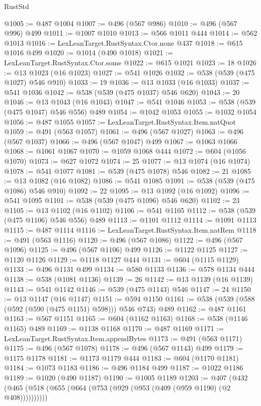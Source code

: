 \begin{lexlean}{RustStd}
\begin{coremodule}
@1005 := @487 @1004
@1007 := @496 (@567 @986)
@1010 := @496 (@567 @996) @499
@1011 := @1007 @1010
@1013 := @566 @1011 @444
@1014 := @562 @1013
@1016 := LexLeanTarget.RustSyntax.Ctor.none @437
@1018 := @615 @1016 @499
@1020 := @1014 (@490 @1018)
@1021 := LexLeanTarget.RustSyntax.Ctor.some
@1022 := @615 @1021
@1023 := 18
@1026 := @13 @1023 (@16 @1023)
@1027 := @541 @1026
@1032 := @538 (@539 (@475 @1027) @546 @910)
@1033 := 19
@1036 := @13 @1033 (@16 @1033)
@1037 := @541 @1036
@1042 := @538 (@539 (@475 @1037) @546 @620)
@1043 := 20
@1046 := @13 @1043 (@16 @1043)
@1047 := @541 @1046
@1053 := @538 (@539 (@475 @1047) @546 @556) @489
@1054 := @1042 @1053
@1055 := @1032 @1054
@1056 := @487 @1055
@1057 := LexLeanTarget.RustSyntax.Item.natQuot
@1059 := @491 (@563 @1057)
@1061 := @496 (@567 @1027)
@1063 := @496 (@567 @1037)
@1066 := @496 (@567 @1047) @499
@1067 := @1063 @1066
@1068 := @1061 @1067
@1070 := @1059 @1068 @444
@1072 := @604 (@1056 @1070)
@1073 := @627 @1072
@1074 := 25
@1077 := @13 @1074 (@16 @1074)
@1078 := @541 @1077
@1081 := @539 (@475 @1078) @546
@1082 := 21
@1085 := @13 @1082 (@16 @1082)
@1086 := @541 @1085
@1091 := @538 (@539 (@475 @1086) @546 @910)
@1092 := 22
@1095 := @13 @1092 (@16 @1092)
@1096 := @541 @1095
@1101 := @538 (@539 (@475 @1096) @546 @620)
@1102 := 23
@1105 := @13 @1102 (@16 @1102)
@1106 := @541 @1105
@1112 := @538 (@539 (@475 @1106) @546 @556) @489
@1113 := @1101 @1112
@1114 := @1091 @1113
@1115 := @487 @1114
@1116 := LexLeanTarget.RustSyntax.Item.natRem
@1118 := @491 (@563 @1116)
@1120 := @496 (@567 @1086)
@1122 := @496 (@567 @1096)
@1125 := @496 (@567 @1106) @499
@1126 := @1122 @1125
@1127 := @1120 @1126
@1129 := @1118 @1127 @444
@1131 := @604 (@1115 @1129)
@1133 := @496 @1131 @499
@1134 := @580 @1133
@1136 := @578 @1134 @444
@1138 := @538 (@1081 @1136)
@1139 := 26
@1142 := @13 @1139 (@16 @1139)
@1143 := @541 @1142
@1146 := @539 (@475 @1143) @546
@1147 := 24
@1150 := @13 @1147 (@16 @1147)
@1151 := @594 @1150
@1161 := @538 (@539 (@588 (@592 (@590 (@475 @1151) @598))) @546 @743) @489
@1162 := @487 @1161
@1163 := @567 @1151
@1165 := @604 (@1162 @1163)
@1168 := @538 (@1146 @1165) @489
@1169 := @1138 @1168
@1170 := @487 @1169
@1171 := LexLeanTarget.RustSyntax.Item.appendBytes
@1173 := @491 (@563 @1171)
@1175 := @496 (@567 @1078)
@1178 := @496 (@567 @1143) @499
@1179 := @1175 @1178
@1181 := @1173 @1179 @444
@1183 := @604 (@1170 @1181)
@1184 := @1073 @1183
@1186 := @496 @1184 @499
@1187 := @1022 @1186
@1189 := @1020 (@490 @1187)
@1190 := @1005 @1189
@1203 := @407 (@432 (@465 (@518 (@655 (@664 (@753 (@929 (@953 (@409 (@959 @1190) (@2 @408))))))))))

\end{coremodule}
\end{lexlean}

